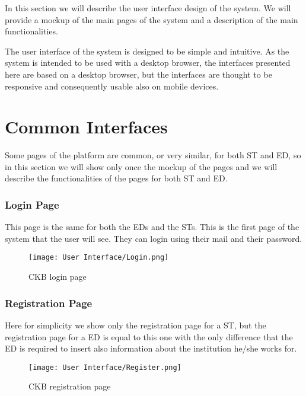 %
In this section we will describe the user interface design of the system. We will provide a mockup of the main pages of the system and a description of the main functionalities.

The user interface of the system is designed to be simple and intuitive. As the system is intended to be used with a desktop browser, the interfaces presented here are based on a desktop browser, but the interfaces are thought to be responsive and consequently usable also on mobile devices.

\section*{Common Interfaces}
\label{s:common_interface}%
Some pages of the platform are common, or very similar, for both ST and ED, so in this section we will show only once the mockup of the pages and we will describe the functionalities of the pages for both ST and ED.

\subsubsection*{Login Page}
\label{ss:login}%
This page is the same for both the EDs and the STs. This is the first page of the system that the user will see. They can login using their mail and their password.

\begin{figure}[H]
  \centering
  \texttt{[image: User Interface/Login.png]}
  \caption{CKB login page}
  \label{fig:login}
\end{figure}

\newpage

\subsubsection*{Registration Page}
\label{ss:registration}%
Here for simplicity we show only the registration page for a ST, but the registration page for a ED is equal to this one with the only difference that the ED is required to insert also information about the institution he/she works for.

\begin{figure}[H]
  \centering
  \texttt{[image: User Interface/Register.png]}
  \caption{CKB registration page}
  \label{fig:registration}
\end{figure}

\newpage

